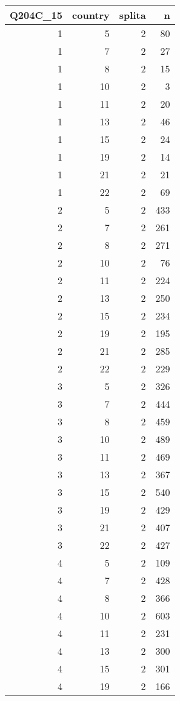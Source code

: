 \documentclass[]{article}
\begin{document}
\begin{tabular}{r|r|r|r}
\hline
Q204C\_15 & country & splita & n\\
\hline
1 & 5 & 2 & 80\\
\hline
1 & 7 & 2 & 27\\
\hline
1 & 8 & 2 & 15\\
\hline
1 & 10 & 2 & 3\\
\hline
1 & 11 & 2 & 20\\
\hline
1 & 13 & 2 & 46\\
\hline
1 & 15 & 2 & 24\\
\hline
1 & 19 & 2 & 14\\
\hline
1 & 21 & 2 & 21\\
\hline
1 & 22 & 2 & 69\\
\hline
2 & 5 & 2 & 433\\
\hline
2 & 7 & 2 & 261\\
\hline
2 & 8 & 2 & 271\\
\hline
2 & 10 & 2 & 76\\
\hline
2 & 11 & 2 & 224\\
\hline
2 & 13 & 2 & 250\\
\hline
2 & 15 & 2 & 234\\
\hline
2 & 19 & 2 & 195\\
\hline
2 & 21 & 2 & 285\\
\hline
2 & 22 & 2 & 229\\
\hline
3 & 5 & 2 & 326\\
\hline
3 & 7 & 2 & 444\\
\hline
3 & 8 & 2 & 459\\
\hline
3 & 10 & 2 & 489\\
\hline
3 & 11 & 2 & 469\\
\hline
3 & 13 & 2 & 367\\
\hline
3 & 15 & 2 & 540\\
\hline
3 & 19 & 2 & 429\\
\hline
3 & 21 & 2 & 407\\
\hline
3 & 22 & 2 & 427\\
\hline
4 & 5 & 2 & 109\\
\hline
4 & 7 & 2 & 428\\
\hline
4 & 8 & 2 & 366\\
\hline
4 & 10 & 2 & 603\\
\hline
4 & 11 & 2 & 231\\
\hline
4 & 13 & 2 & 300\\
\hline
4 & 15 & 2 & 301\\
\hline
4 & 19 & 2 & 166\\

\end{tabular}
\end{document}
